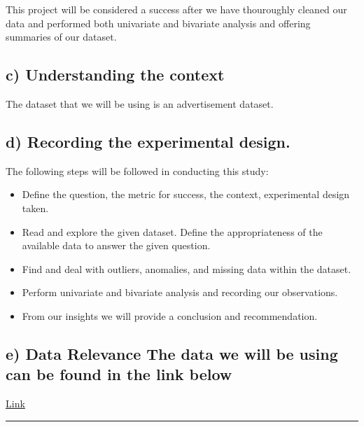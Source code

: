 \documentclass[
]{article}
\begin{document}
This project will be considered a success after we have thouroughly
cleaned our data and performed both univariate and bivariate analysis
and offering summaries of our dataset.

\hypertarget{c-understanding-the-context}{%
\subsection{c) Understanding the
context}\label{c-understanding-the-context}}

The dataset that we will be using is an advertisement dataset.

\hypertarget{d-recording-the-experimental-design.}{%
\subsection{d) Recording the experimental
design.}\label{d-recording-the-experimental-design.}}

The following steps will be followed in conducting this study:

\begin{itemize}
\item
  Define the question, the metric for success, the context, experimental
  design taken.
\item
  Read and explore the given dataset. Define the appropriateness of the
  available data to answer the given question.
\item
  Find and deal with outliers, anomalies, and missing data within the
  dataset.
\item
  Perform univariate and bivariate analysis and recording our
  observations.
\item
  From our insights we will provide a conclusion and recommendation.
\end{itemize}

\hypertarget{e-data-relevance-the-data-we-will-be-using-can-be-found-in-the-link-below}{%
\subsection{e) Data Relevance The data we will be using can be found in
the link
below}\label{e-data-relevance-the-data-we-will-be-using-can-be-found-in-the-link-below}}

\href{http://bit.ly/IPAdvertisingData}{Link}

\begin{center}\rule{0.5\linewidth}{0.5pt}\end{center}
\end{document}
